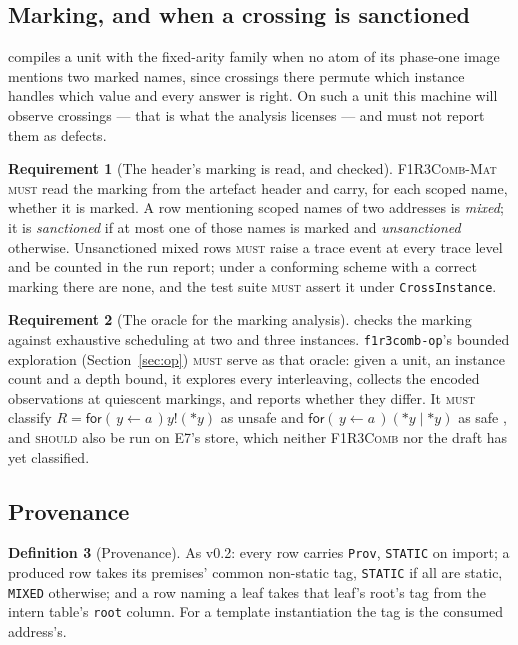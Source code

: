 \documentclass[11pt,a4paper]{article}
\newcommand{\code}[1]{\texttt{#1}}
\newcommand{\Comb}{\textsc{F1R3Comb}}
\newcommand{\Mat}{\textsc{F1R3Comb-Mat}}
\newcommand{\MUST}{\textsc{must}}
\newcommand{\SHOULD}{\textsc{should}}
\newcommand{\drp}[1]{{*}#1}
\theoremstyle{definition}
\newtheorem{definition}{Definition}[section]
\newtheorem{requirement}[definition]{Requirement}
\theoremstyle{plain}
\newcommand{\inp}[3]{\mathsf{for}(\,#1 \leftarrow #2\,)#3}
\newcommand{\out}[2]{#1!(#2)}
\begin{document}
\subsection{Marking, and when a crossing is sanctioned}\label{sec:marking}

\cite[Req.~5.17]{combspec} compiles a unit with the fixed-arity family when no
atom of its phase-one image mentions two marked names, since crossings there
permute which instance handles which value and every answer is right. On such
a unit this machine will observe crossings --- that is what the analysis
licenses --- and must not report them as defects.

\begin{requirement}[The header's marking is read, and checked]
\label{req:marking}
\Mat{} \MUST{} read the marking from the artefact header and carry, for each
scoped name, whether it is marked. A row mentioning scoped names of two
addresses is \emph{mixed}; it is \emph{sanctioned} if at most one of those
names is marked and \emph{unsanctioned} otherwise. Unsanctioned mixed rows
\MUST{} raise a trace event at every trace level and be counted in the run
report; under a conforming scheme with a correct marking there are none, and
the test suite \MUST{} assert it under \code{CrossInstance}.
\end{requirement}

\begin{requirement}[The oracle for the marking analysis]\label{req:oracle}
\cite[Obl.~11.4]{combspec} checks the marking against exhaustive scheduling
at two and three instances. \code{f1r3comb-op}'s bounded exploration
(Section~\ref{sec:op}) \MUST{} serve as that oracle: given a unit, an instance
count and a depth bound, it explores every interleaving, collects the encoded
observations at quiescent markings, and reports whether they differ. It
\MUST{} classify $R = \inp{y}{a}{\out{y}{\drp{y}}}$ as unsafe and
$\inp{y}{a}{(\drp{y} \mid \drp{y})}$ as safe \cite[Req.~5.18]{combspec},
and \SHOULD{} also be run on E7's store, which neither \Comb{} nor the draft
has yet classified.
\end{requirement}

\subsection{Provenance}\label{sec:prov}

\begin{definition}[Provenance]\label{def:prov}
As v0.2: every row carries \code{Prov}, \code{STATIC} on import; a produced
row takes its premises' common non-static tag, \code{STATIC} if all are
static, \code{MIXED} otherwise; and a row naming a leaf takes that leaf's
root's tag from the intern table's \code{root} column. For a template
instantiation the tag is the consumed address's.
\end{definition}
\end{document}
